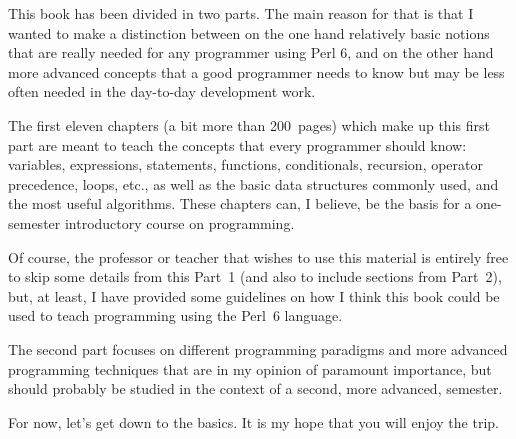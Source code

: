 %

This book has been divided in two parts. The main reason for that
is that I wanted to make a distinction between on the one hand 
relatively basic notions that are really needed for any programmer 
using Perl 6, and on the other hand more advanced concepts that 
a good programmer needs to know but may be less often needed in 
the day-to-day development work.

The first eleven chapters (a bit more than 200~pages) which make up 
this first part are meant to teach the concepts that every 
programmer should know: variables, expressions, statements, 
functions, conditionals, recursion, operator precedence, loops, etc., 
as well as the basic data structures commonly used, and the most 
useful algorithms.  These chapters can, I believe, be the basis 
for a one-semester introductory course on programming. 

Of course, the professor or teacher that wishes to use this 
material is entirely free to skip some details from this 
Part~1 (and also to include sections from Part~2), but, at 
least, I have provided some guidelines on how I think this 
book could be used to teach programming using the Perl~6 language.

The second part focuses on different programming paradigms and 
more advanced programming techniques that are in my opinion of 
paramount importance, but should probably be studied in the context
of a second, more advanced, semester.

For now, let's get down to the basics. It is my hope that you 
will enjoy the trip.

